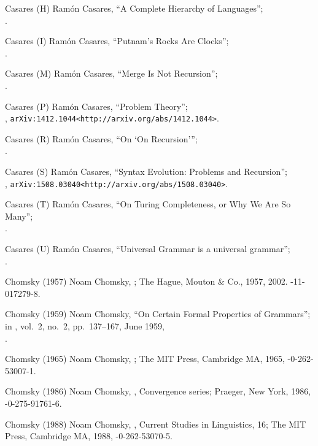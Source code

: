  Casares (H)
Ram\'on Casares,
``A Complete Hierarchy of Languages'';\\
.

 Casares (I)
Ram\'on Casares,
``Putnam's Rocks Are Clocks'';\\
.

 Casares (M)
Ram\'on Casares,
``Merge Is Not Recursion'';\\
.

 Casares (P)
Ram\'on Casares,
``Problem Theory'';\\
,
{\tt\URL arXiv:1412.1044<http://arxiv.org/abs/1412.1044>}.

 Casares (R)
Ram\'on Casares,
``On `On Recursion'\thinspace'';\\
.

 Casares (S)
Ram\'on Casares,
``Syntax Evolution: Problems and Recursion'';\\
,
{\tt\URL arXiv:1508.03040<http://arxiv.org/abs/1508.03040>}.

 Casares (T)
Ram\'on Casares,
``On Turing Completeness, or Why We Are So Many'';\\
.

 Casares (U)
Ram\'on Casares,
``Universal Grammar is a universal grammar'';\\
.

 Chomsky (1957)
Noam Chomsky,
;
The Hague, Mouton \& Co., 1957, 2002.
-11-017279-8.

 Chomsky (1959)
Noam Chomsky,
``On Certain Formal Properties of Grammars'';\\
in ,
vol.\ 2, no.\ 2, pp.\ 137--167, June 1959,\\
.

 Chomsky (1965)
Noam Chomsky,
;
The MIT Press, Cambridge MA, 1965,
-0-262-53007-1.

 Chomsky (1986)
Noam Chomsky,
,
Convergence series;
Praeger, New York, 1986,
-0-275-91761-6.

 Chomsky (1988)
Noam Chomsky,
,
Current Studies in Linguistics, 16;
The MIT Press, Cambridge MA, 1988,
-0-262-53070-5.

